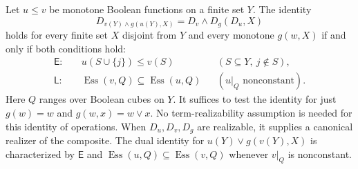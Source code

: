 \begin{theorem}
\label{core:thm:essential-universal-overlap}
Let $u\leq v$ be monotone Boolean functions on a finite set $Y$.
The identity
\begin{equation}\label{core:eq:universal-overlap}
 D_{v(Y)\wedge g(u(Y),X)}
   =D_v\wedge D_g(D_u,X)
\end{equation}
holds for every finite set $X$ disjoint from $Y$ and every monotone
$g(w,X)$ if and only if both conditions hold:
\begin{align*}
 \mathsf E:\quad&u(S\cup\{j\})\leq v(S)
       &&(S\subseteq Y,\ j\notin S),\\
 \mathsf L:\quad&\operatorname{Ess}(v,Q)\subseteq
                 \operatorname{Ess}(u,Q)
       &&(u|_Q\text{ nonconstant}).
\end{align*}
Here $Q$ ranges over Boolean cubes on $Y$. It suffices to test the
identity for just $g(w)=w$ and $g(w,x)=w\vee x$.
No term-realizability assumption is needed for this identity of operations.
When $D_u,D_v,D_g$ are realizable, it supplies a canonical realizer of
the composite. The dual identity for $u(Y)\vee g(v(Y),X)$ is characterized
by $\mathsf E$ and
$\operatorname{Ess}(u,Q)\subseteq\operatorname{Ess}(v,Q)$ whenever
$v|_Q$ is nonconstant.
\end{theorem}
